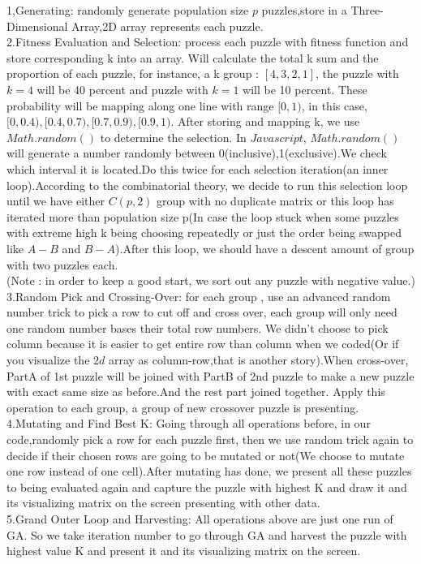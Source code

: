 \documentclass[12pt, letterpaper]{article}
\begin{document}
	1,Generating: randomly generate population size $p$ puzzles,store in a Three-Dimensional Array,2D array represents each puzzle.\\
	
	2.Fitness Evaluation and Selection: process each puzzle with fitness function and store corresponding k into an array. Will calculate the total k sum and the proportion of each puzzle, for instance, a k group : $[4,3,2,1]$, the puzzle with ${k=4}$ will be 40 percent and puzzle with $k=1$ will be 10 percent. These probability will be mapping along one line with range $[0,1)$, in this case,$[0,0.4),[0.4,0.7),[0.7,0.9),[0.9,1)$. After storing and mapping k, we use $Math.random()$ to determine the selection. In $Javascript$, $Math.random()$ will generate a number randomly between 0(inclusive),1(exclusive).We check which interval it is located.Do this twice for each selection iteration(an inner loop).According to the combinatorial theory, we decide to run this selection loop until we have either $C(p,2)$ group with no duplicate matrix or this loop has iterated more than population size p(In case the loop stuck when some puzzles with extreme high k being choosing repeatedly or just the order being swapped like $A-B$ and $B-A$).After this loop, we should have a descent amount of group with two puzzles each.\\
	
	(Note : in order to keep a good start, we sort out any puzzle with negative value.)\\
	
	3.Random Pick and Crossing-Over: for each group , use an advanced random number trick to pick a row to cut off and cross over, each group will only need one random number bases their total row numbers. We didn't choose to pick column because it is easier to get entire row than column when we coded(Or if you visualize the $2d$ array as column-row,that is another story).When cross-over, PartA of 1st puzzle will be joined with PartB of 2nd puzzle to make a new puzzle with exact same size as before.And the rest part joined together. Apply this operation to each group, a group of new crossover puzzle is presenting.\\
	
	4.Mutating and Find Best K: Going through all operations before, in our code,randomly pick a row for each puzzle first, then we use random trick again to decide if their chosen rows are going to be mutated or not(We choose to mutate one row instead of one cell).After mutating has done, we present all these puzzles to being evaluated again and capture the puzzle with highest K and draw it and its visualizing matrix on the screen presenting with other data.\\
	
	5.Grand Outer Loop and Harvesting: All operations above are just one run of GA. So we take iteration number to go through GA and harvest the puzzle with highest value K and present it and its visualizing matrix on the screen.\\
\end{document}
